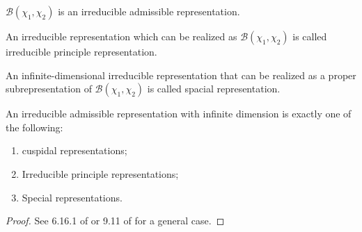\begin{proposition}
$\mathcal B(\chi_1,\chi_2)$ is an irreducible admissible representation. 
\end{proposition}

\begin{definition}
An irreducible representation which can be realized as $\mathcal B(\chi_1,\chi_2)$ is called irreducible principle representation.
\end{definition}

\begin{definition}
An infinite-dimensional irreducible representation that can be realized as a proper subrepresentation of $\mathcal B(\chi_1,\chi_2)$ is called spacial representation.
\end{definition} 

\begin{theorem}
An irreducible admissible representation with infinite dimension is exactly one of the following:\\
\begin{enumerate}
  \item cuspidal representations;
  \item Irreducible principle representations;
  \item Special representations.
\end{enumerate}
\end{theorem}

\begin{proof}
See 6.16.1 of  or 9.11 of  for a general case.
\end{proof}
